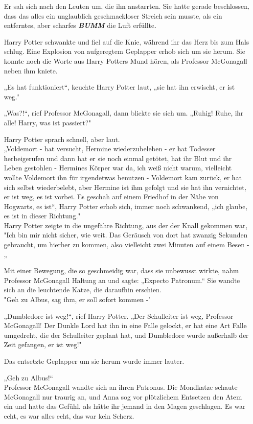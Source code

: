 {Er sah sich nach den Leuten um, die ihn anstarrten. Sie hatte gerade beschlossen, dass das alles ein unglaublich geschmackloser Streich sein musste, als ein entferntes, aber scharfes \textbf{\emph{BUMM}} die Luft erfüllte.

Harry Potter schwankte und fiel auf die Knie, während ihr das Herz bis zum Hals schlug. Eine Explosion von aufgeregtem Geplapper erhob sich um sie herum. Sie konnte noch die Worte aus Harry Potters Mund hören, als Professor McGonagall neben ihm kniete.

„Es hat funktioniert“, keuchte Harry Potter laut, „sie hat ihn erwischt, er ist weg."

„Was?!“, rief Professor McGonagall, dann blickte sie sich um. „Ruhig! Ruhe, ihr alle! Harry, was ist passiert?"

Harry Potter sprach schnell, aber laut.\\ „Voldemort - hat versucht, Hermine wiederzubeleben - er hat Todesser herbeigerufen und dann hat er sie noch einmal getötet, hat ihr Blut und ihr Leben gestohlen - Hermines Körper war da, ich weiß nicht warum, vielleicht wollte Voldemort ihn für irgendetwas benutzen - Voldemort kam zurück, er hat sich selbst wiederbelebt, aber Hermine ist ihm gefolgt und sie hat ihn vernichtet, er ist weg, es ist vorbei. Es geschah auf einem Friedhof in der Nähe von Hogwarts, es ist“, Harry Potter erhob sich, immer noch schwankend, „ich glaube, es ist in dieser Richtung."\\ Harry Potter zeigte in die ungefähre Richtung, aus der der Knall gekommen war,\\ "Ich bin mir nicht sicher, wie weit. Das Geräusch von dort hat zwanzig Sekunden gebraucht, um hierher zu kommen, also vielleicht zwei Minuten auf einem Besen -„

Mit einer Bewegung, die so geschmeidig war, dass sie unbewusst wirkte, nahm Professor McGonagall Haltung an und sagte: „Expecto Patronum.“ Sie wandte sich an die leuchtende Katze, die daraufhin erschien.\\ "Geh zu Albus, sag ihm, er soll sofort kommen -"

„Dumbledore ist weg!“, rief Harry Potter. „Der Schulleiter ist weg, Professor McGonagall! Der Dunkle Lord hat ihn in eine Falle gelockt, er hat eine Art Falle umgedreht, die der Schulleiter geplant hat, und Dumbledore wurde außerhalb der Zeit gefangen, er ist weg!"

Das entsetzte Geplapper um sie herum wurde immer lauter.

„Geh zu Albus!“\\ Professor McGonagall wandte sich an ihren Patronus. Die Mondkatze schaute McGonagall nur traurig an, und Anna sog vor plötzlichem Entsetzen den Atem ein und hatte das Gefühl, als hätte ihr jemand in den Magen geschlagen. Es war echt, es war alles echt, das war kein Scherz.

}
